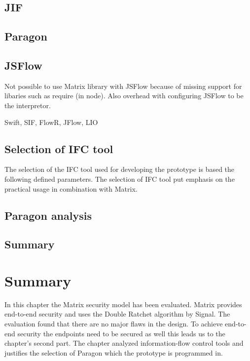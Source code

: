 \subsection{JIF}

\subsection{Paragon}

\subsection{JSFlow}
Not possible to use Matrix library with JSFlow because of missing support for libaries such as require (in node). Also overhead with configuring JSFlow to be the interpretor.

Swift, SIF, FlowR, JFlow, LIO


\subsection{Selection of IFC tool}
The selection of the IFC tool used for developing the prototype is based the following defined parameters.
The selection of IFC tool put emphasis on the practical usage in combination with Matrix. 

\subsection{Paragon analysis}

\subsection{Summary}


\section{Summary}
In this chapter the Matrix security model has been evaluated. Matrix provides end-to-end security and uses the Double Ratchet algorithm by Signal. The evaluation found that there are no major flaws in the design. To achieve end-to-end security the endpoints need to be secured as well \cite{Sabelfeld2003} this leads us to the chapter's second part. The chapter analyzed information-flow control tools and justifies the selection of Paragon which the prototype is programmed in. 